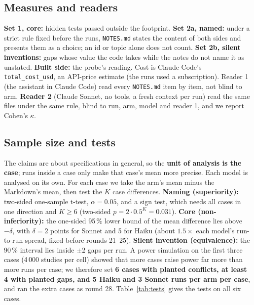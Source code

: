 \documentclass{article}
\newcommand{\code}[1]{\texttt{#1}}
\begin{document}
\subsection{Measures and readers}

\textbf{Set 1, core:} hidden tests passed outside the footprint. \textbf{Set 2a, named:} under a strict rule
fixed before the runs, \code{NOTES.md} states the content of both sides and presents them as a choice; an id
or topic alone does not count. \textbf{Set 2b, silent inventions:} gaps whose value the code takes while the
notes do not name it as unstated. \textbf{Built side:} the probe's reading. Cost is Claude Code's
\code{total\_cost\_usd}, an API-price estimate (the runs used a subscription). Reader 1 (the assistant in
Claude Code) read every \code{NOTES.md} item by item, not blind to arm. \textbf{Reader 2} (Claude Sonnet, no
tools, a fresh context per run) read the same files under the same rule, blind to run, arm, model and
reader 1, and we report Cohen's $\kappa$.

\subsection{Sample size and tests}\label{sec:stats}

The claims are about specifications in general, so the \textbf{unit of analysis is the case}; runs inside a
case only make that case's mean more precise. Each model is analysed on its own. For each case we take
the arm's mean minus the Markdown's mean, then test the $K$ case differences.
\textbf{Naming (superiority):} two-sided one-sample t-test, $\alpha = 0.05$, and a sign test, which needs all
cases in one direction and $K \ge 6$ (two-sided $p = 2 \cdot 0.5^K = 0.031$). \textbf{Core
(non-inferiority):} the one-sided 95\,\% lower bound of the mean difference lies above $-\delta$, with
$\delta = 2$ points for Sonnet and 5 for Haiku (about $1.5\times$ each model's run-to-run spread, fixed before
rounds 21--25). \textbf{Silent invention (equivalence):} the 90\,\% interval lies inside $\pm 2$ gaps per run.
A power simulation on the first three cases (4\,000 studies per cell) showed that more cases raise power
far more than more runs per case; we therefore set \textbf{6 cases with planted conflicts, at least 4 with
planted gaps, and 5 Haiku and 3 Sonnet runs per arm per case}, and ran the extra cases as round 28.
Table~\ref{tab:tests} gives the tests on all six cases.
\end{document}
